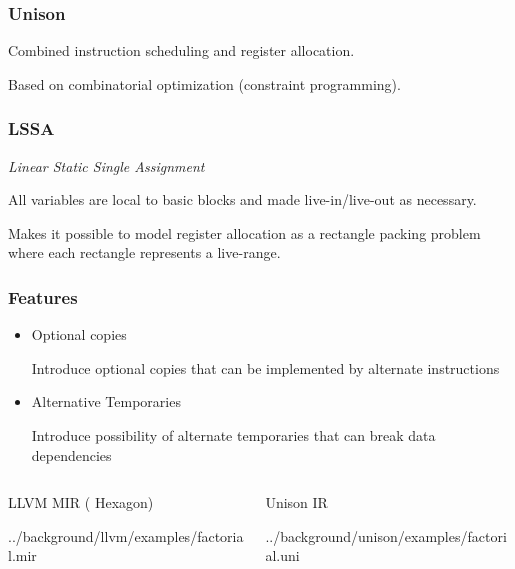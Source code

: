 \begin{frame}
	\frametitle{Unison}
	
	Combined instruction scheduling and register allocation.

	\vspace{0.5cm}

	Based on combinatorial optimization (constraint programming).

\end{frame}

\begin{frame}
	\frametitle{LSSA}
	\textit{Linear Static Single Assignment}
	
	All variables are local to basic blocks and made live-in/live-out as necessary.

	\vspace{0.5cm}

	Makes it possible to model register allocation as a rectangle packing problem where
	each rectangle represents a live-range.

\end{frame}

\begin{frame}
	\frametitle{Features}
	\begin{itemize}
		\item Optional copies

			Introduce optional copies that can be implemented by alternate instructions

		\item Alternative Temporaries

			Introduce possibility of alternate temporaries that can break data dependencies
	\end{itemize}
\end{frame}

\begin{frame}
	\begin{columns}
		\begin{column}{0.5\textwidth}
			LLVM MIR ( Hexagon)

			
			{../background/llvm/examples/factorial.mir}
		\end{column}

		\begin{column}{0.5\textwidth}
			Unison IR

			
			{../background/unison/examples/factorial.uni}
		\end{column}
	\end{columns}
\end{frame}


